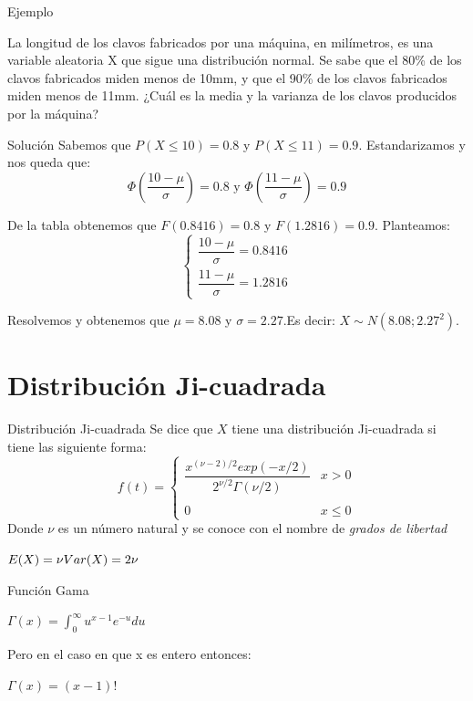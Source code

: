 \documentclass[11pt]{beamer}
\begin{document}
\begin{frame}{Ejemplo}

La longitud de los clavos fabricados por una m\'aquina, en mil\'imetros, es una variable aleatoria X que sigue una distribuci\'on normal. Se sabe que el 80\% de los clavos fabricados miden menos de 10mm, y que el 90\% de los clavos fabricados miden menos de 11mm. ¿Cu\'al es la media y la varianza de los clavos producidos por la m\'aquina?
\end{frame}

\begin{frame}{Soluci\'on}
Sabemos que $P(X\le 10)=0.8 $ y $P(X\le 11)=0.9$. Estandarizamos y nos queda que:
$$\Phi \left(\frac{10 -\mu}{\sigma}\right) =0.8 \mbox{ y } \Phi \left(\frac{11 -\mu}{\sigma} \right) =0.9$$


De la tabla obtenemos que $F(0.8416)=0.8$ y $F(1.2816)=0.9$. Planteamos:
$$\left\{\begin{matrix}
\dfrac{10 -\mu}{\sigma}=0.8416\\ 
\dfrac{11 -\mu}{\sigma}=1.2816
\end{matrix}\right.$$

Resolvemos y obtenemos que $\mu =8.08$ y $\sigma =2.27 $.Es decir: $X\sim N(8.08;2.{ 27 }^{ 2 })$.
\end{frame}

\section{Distribución Ji-cuadrada}


\begin{frame}{Distribuci\'on Ji-cuadrada}
Se dice que $X$ tiene una distribuci\'on Ji-cuadrada  si tiene las siguiente forma:
$$f(t)=\left\{\begin{matrix}
\dfrac{x^{(\nu -2)/2}exp(-x/2)}{2^{\nu/2}\Gamma(\nu/2)} & x>0\\ 
& \\
0 & x\le 0 
\end{matrix}\right.$$
Donde $\nu$ es un n\'umero natural y se conoce con el nombre de \textit{grados de libertad}

\bigskip
$E(X)=\nu \hfill  Var(X)=2\nu $
\end{frame}

\begin{frame}{Función Gama}

$\Gamma \left( x \right) = \int_{0}^{\infty}u^{x-1} e^{-u}du$

\bigskip
Pero en el caso en que x es entero entonces:


\bigskip
$\Gamma \left( x \right) = (x-1)!$

\end{frame}
\end{document}
